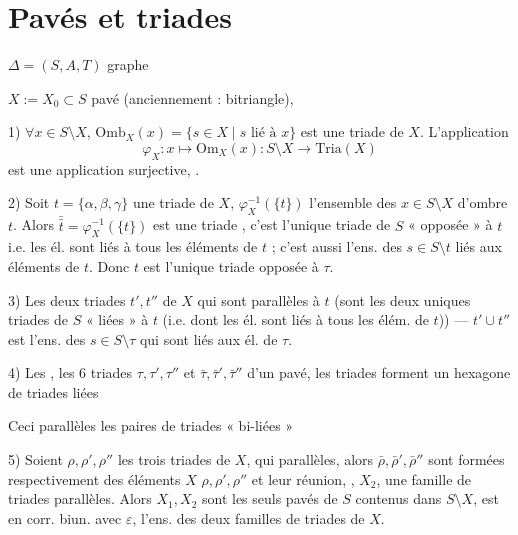 \documentclass[11pt,a4paper]{article}
\begin{document}
\section{Pavés et triades}

$\Delta = (S,A,T)$ graphe 

$X := X_0 \subset S$ pavé (anciennement : bitriangle),

1) $\forall x \in S \setminus X$, $\mathrm{Omb}_X(x) = \{ s \in X \mid s \text{ lié à } x \}$ est une triade de $X$. L'application
\[
  \varphi_X : x \mapsto \mathrm{Om}_X(x) : S \setminus X \to \mathrm{Tria}(X)
\]
est une application surjective, .

2) Soit $t = \{\alpha,\beta,\gamma\}$ une triade de $X$, $\varphi_X^{-1}(\{t\})$ l'ensemble des $x \in S \setminus X$ d'ombre $t$. Alors $\bar{\bar t} = \varphi_X^{-1}(\{t\})$ est une triade , c'est l'unique triade de $S$  « opposée » à $t$ i.e.  les él. sont \struck{\ill{}} liés à tous les éléments de $t$ ; c'est aussi l'ens. des $s \in S \setminus t$ \struck{\ill{}} liés aux éléments de $t$. Donc $t$ est l'unique triade opposée à $\tau$.

3) Les deux triades $t', t''$ de $X$  qui sont parallèles à $t$ (sont les deux uniques triades de $S$ « liées » à $t$  (i.e. dont les él. sont \struck{\ill{}} liés à tous les élém. de $t$)) — $t' \cup t''$ est l'ens. des $s \in S \setminus \tau$ qui sont \struck{\ill{}} liés aux él. de $\tau$.

4) Les  , les 6 triades $\tau, \tau', \tau''$ et $\bar\tau, \bar\tau', \bar\tau''$ d'un pavé, \ill{} les triades  forment un hexagone de triades liées


Ceci  \ill{} parallèles les paires de triades « bi-liées » 

5) Soient $\rho, \rho', \rho''$ les trois  triades de $X$, qui   parallèles, alors $\bar\rho, \bar\rho', \bar\rho''$ sont formées respectivement des éléments  \ill{} $X$ \ill{} $\rho, \rho', \rho''$ et leur réunion, \ill{},  $X_2$,   une famille de triades parallèles. Alors $X_1, X_2$ sont les seuls pavés  de $S$ contenus dans $S \setminus X$,  \ill{}  est en corr. biun. avec $\varepsilon$, l'ens. des deux familles de triades de $X$.
\end{document}
